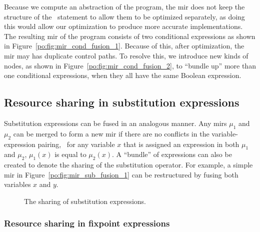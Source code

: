 Because we compute an abstraction of the program, the \gls{mir} does not
keep the structure of the \iflit~statement to allow them to be optimized
separately, as doing this would allow our optimization to produce more accurate
implementations.  The resulting \gls{mir} of the program consists of two
conditional expressions as shown in Figure~\ref{po:fig:mir_cond_fusion_1}.
Because of this, after optimization, the \gls{mir} may has duplicate control
paths.  To resolve this, we introduce new kinds of nodes, as shown in
Figure~\ref{po:fig:mir_cond_fusion_2}, to ``bundle up'' more than one
conditional expressions, when they all have the same Boolean expression.


\subsection{Resource sharing in substitution expressions}

Substitution expressions can be fused in an analogous manner.  Any \glspl{mir}
$\mu_1$ and $\mu_2$ can be merged to form a new \gls{mir} if there are no
conflicts in the variable-expression pairing, \ie~for any variable $x$ that
is assigned an expression in both $\mu_1$ and $\mu_2$, $\mu_1(x)$ is equal
to $\mu_2(x)$.  A ``bundle'' of expressions can also be created to denote
the sharing of the substitution operator.  For example, a simple \gls{mir}
in Figure~\ref{po:fig:mir_sub_fusion_1} can be restructured by fusing both
variables $x$ and $y$.
\begin{figure}[ht]
    \centering
    \caption{The sharing of substitution expressions.}
\end{figure}

\subsubsection{Resource sharing in fixpoint expressions}

